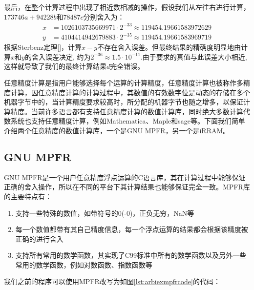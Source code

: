 最后，在整个计算过程中出现了相近数相减的操作，假设我们从左往右进行计算，$173746a+94228b$和$78487c$分别舍入为：
\begin{align*}
x & =1026103735669971·2^{-33}≈119454.19661583972629 \\
y & =4104414942679883·2^{-35}≈119454.19661583969719
\end{align*}
根据Sterbenz定理[]，计算$x−y$不存在舍入误差。但最终结果的精确度明显地由计算$x$和$y$的舍入误差决定, 约为$2^{-36}≈1.5·10^{-11} $.由于要求的真值与此误差大小相近, 这样就导致了我们的最终计算结果$d$完全错误。

任意精度计算是指用户能够选择每个运算的计算精度，任意精度计算也被称作多精度计算，因任意精度计算的计算过程中，其数值的有效数字位是动态的存储在多个机器字节中的，当计算精度要求较高时，所分配的机器字节也随之增多，以保证计算精度。当前许多语言都有支持任意精度计算的数值计算库，同时绝大多数计算代数系统也支持任意精度计算，例如Mathematica、Maple和sage等。下面我们简单介绍两个任意精度的数值计算库，一个是GNU MPFR，另一个是iRRAM。

\subsection{GNU MPFR}

GNU MPFR是一个用户任意精度浮点运算的C语言库，其在计算过程中能够保证正确的舍入操作，所以在不同的平台下其计算结果也能够保证完全一致。MPFR库的主要特点有：

\begin{enumerate}
\item 支持一些特殊的数值，如带符号的0(-0)，正负无穷，NaN等
\item 每一个数值都带有其自己精度信息，每一个浮点运算的结果都会根据该精度被正确的进行舍入
\item 支持所有常用的数学函数，其实现了C99标准中所有的数学函数以及另外一些常用的数学函数，例如对数函数、指数函数等
\end{enumerate}

我们之前的程序可以使用MPFR改写为如图\ref{lst:arbiexmpfrcode}的代码：

